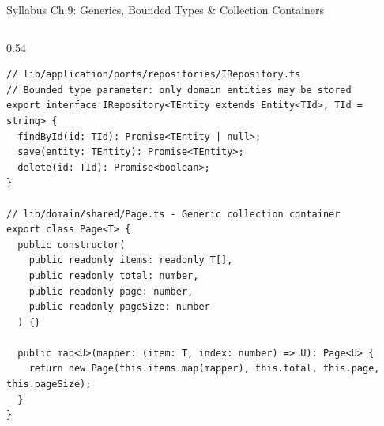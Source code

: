 ﻿\documentclass[aspectratio=169,10pt,t]{beamer}
\begin{document}
\begin{frame}[fragile]{Syllabus Ch.9: Generics, Bounded Types \& Collection Containers}
  \vspace{-1.2mm}
  \begin{columns}[T,onlytextwidth]
    \begin{column}{0.54\textwidth}
      \begin{codeBox}
\begin{lstlisting}
// lib/application/ports/repositories/IRepository.ts
// Bounded type parameter: only domain entities may be stored
export interface IRepository<TEntity extends Entity<TId>, TId = string> {
  findById(id: TId): Promise<TEntity | null>;
  save(entity: TEntity): Promise<TEntity>;
  delete(id: TId): Promise<boolean>;
}

// lib/domain/shared/Page.ts - Generic collection container
export class Page<T> {
  public constructor(
    public readonly items: readonly T[],
    public readonly total: number,
    public readonly page: number,
    public readonly pageSize: number
  ) {}

  public map<U>(mapper: (item: T, index: number) => U): Page<U> {
    return new Page(this.items.map(mapper), this.total, this.page, this.pageSize);
  }
}
\end{lstlisting}
      \end{codeBox}
    \end{column}


\end{columns}
\end{frame}
\end{document}
